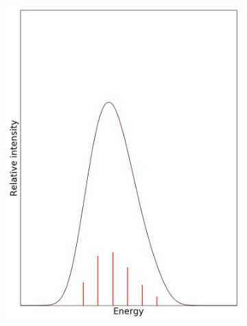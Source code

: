 \documentclass[12pt, fleqn]{beamer}
\begin{document}
\begin{frame}
\begin{overlayarea}{\textwidth}{14cm}
{\begin{figure}[h!]
\begin{subfigure}[b]{0.45\linewidth}
                    \includegraphics[width=\linewidth]{fc_sp/sp_5.png}
                \end{subfigure}
            \end{figure}
        }
\end{overlayarea}
\end{frame}
\end{document}
